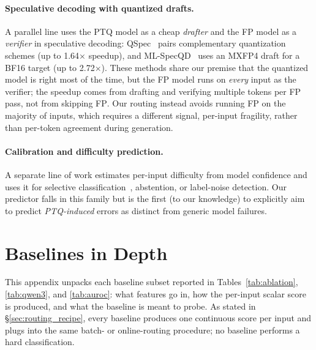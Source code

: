 \documentclass{article}
\newcommand{\fp}{\textsc{FP}\xspace}
\newcommand{\ptq}{\textsc{PTQ}\xspace}
\begin{document}
\paragraph{Speculative decoding with quantized drafts.}
A parallel line uses the \ptq{} model as a cheap \emph{drafter} and the \fp{} model as a \emph{verifier} in speculative decoding: QSpec~\cite{zhao2025qspec} pairs complementary quantization schemes (up to 1.64$\times$ speedup), and ML-SpecQD~\cite{georganas2025mlspecqdmultilevelspeculativedecoding} uses an MXFP4 draft for a BF16 target (up to 2.72$\times$). These methods share our premise that the quantized model is right most of the time, but the \fp{} model runs on \emph{every} input as the verifier; the speedup comes from drafting and verifying multiple tokens per \fp{} pass, not from skipping \fp{}. Our routing instead avoids running \fp{} on the majority of inputs, which requires a different signal, per-input fragility, rather than per-token agreement during generation.

\paragraph{Calibration and difficulty prediction.}
A separate line of work estimates per-input difficulty from model confidence and uses it for selective classification~\cite{geifman2017selective}, abstention, or label-noise detection.
Our predictor falls in this family but is the first (to our knowledge) to explicitly aim to predict \emph{\ptq-induced} errors as distinct from generic model failures.

\section{Baselines in Depth}\label{app:baselines_indepth}

This appendix unpacks each baseline subset reported in Tables~\ref{tab:ablation}, \ref{tab:qwen3}, and \ref{tab:auroc}: what features go in, how the per-input scalar score is produced, and what the baseline is meant to probe. As stated in \S\ref{sec:routing_recipe}, every baseline produces one continuous score per input and plugs into the same batch- or online-routing procedure; no baseline performs a hard classification.
\end{document}

